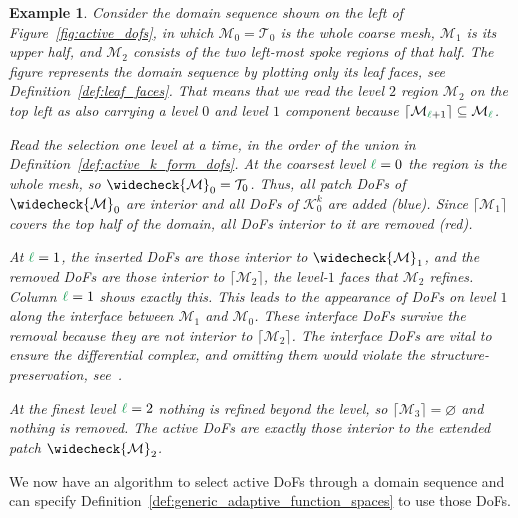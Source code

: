 \documentclass[a4paper, 12pt]{article}
\newcommand{\green}{\color{ForestGreen}}
\newcommand{\T}{\mathcal{T}}
\newcommand{\K}{\mathcal{K}}
\renewcommand{\l}{{\green\ell}}
\newcommand{\M}{\mathcal{M}}
\newtheorem{example}[theorem]{Example}
\theoremstyle{definition}
\theoremstyle{plain}
\numberwithin{equation}{section}
\newcommand{\extendedPatch}[1]{\widecheck{#1}}
\newcommand{\ancestorPatch}[1]{\lceil #1 \rceil}
\begin{document}
\begin{example}
    \label{ex:selection}
    Consider the domain sequence shown on the left of Figure~\ref{fig:active_dofs}, in which $\M_0 = \T_0$ is the whole coarse mesh, $\M_1$ is its upper half, and $\M_2$ consists of the two left-most spoke regions of that half. The figure represents the domain sequence by plotting only its leaf faces, see Definition~\ref{def:leaf_faces}. That means that we read the level $2$ region $\M_2$ on the top left as also carrying a level $0$ and level $1$ component because $\ancestorPatch{\M_{\l+1}} \subseteq \M_{\l}$.

    Read the selection one level at a time, in the order of the union in Definition~\ref{def:active_k_form_dofs}. At the coarsest level $\l = 0$ the region is the whole mesh, so $\extendedPatch{\M}_0 = \T_0$. Thus, all patch DoFs of $\extendedPatch{\M}_0$ are interior and all DoFs of $\K^k_0$ are added (blue). Since $\ancestorPatch{\M_1}$ covers the top half of the domain, all DoFs interior to it are removed (red).

    At $\l = 1$, the inserted DoFs are those interior to $\extendedPatch{\M}_1$, and the removed DoFs are those interior to $\ancestorPatch{\M_2}$, the level-$1$ faces that $\M_2$ refines. Column $\l = 1$ shows exactly this. This leads to the appearance of DoFs on level $1$ along the interface between $\M_1$ and $\M_0$. These \emph{interface DoFs} survive the removal because they are not interior to $\ancestorPatch{\M_2}$. The interface DoFs are vital to ensure the differential complex, and omitting them would violate the structure-preservation, see~\cite{companion_paper}.

    At the finest level $\l = 2$ nothing is refined beyond the level, so $\ancestorPatch{\M_3} =
    \varnothing$ and nothing is removed. The active DoFs are exactly those interior to the
    extended patch $\extendedPatch{\M}_2$.
\end{example}

We now have an algorithm to select active DoFs through a domain sequence and can specify Definition~\ref{def:generic_adaptive_function_spaces} to use those DoFs.
\end{document}
